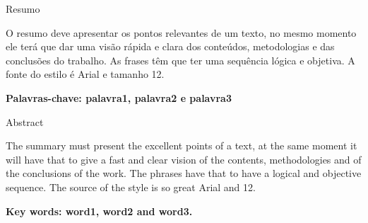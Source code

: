 \begin{resumo}{Resumo}
   
   O resumo deve apresentar os pontos relevantes de um texto, no mesmo momento ele terá que dar uma visão rápida e clara dos conteúdos, metodologias e das conclusões do trabalho. As frases têm que ter uma sequência lógica e objetiva. A fonte do estilo é Arial e tamanho 12.\par
   \vspace{1cm}
   {\noindent\bf Palavras-chave: palavra1, palavra2 e palavra3}\par
\end{resumo}

\begin{resumo}{Abstract}
   
   The summary must present the excellent points of a text, at the same moment it will have that to give a fast and clear vision of the contents, methodologies and of the conclusions of the work.  The phrases have that to have a logical and objective sequence.  The source of the style is so great Arial and 12.\par
   \vspace{1cm}
   {\noindent\bf Key words: word1, word2 and word3.}\par
\end{resumo}
